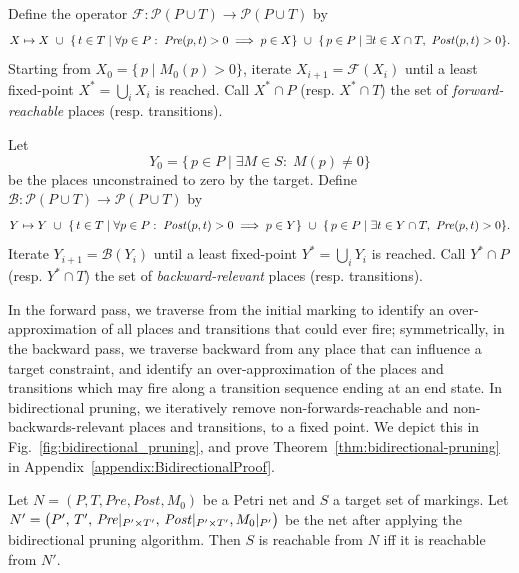 \begin{definition}
	Define the operator $\mathcal{F}:\mathcal{P}(P\cup T)\to\mathcal{P}(P\cup T)$ by
	\[
	X \mapsto X
	~\cup~
	\{\,t\in T \mid \forall p\in P:\; \mathit{Pre}(p,t)>0 \implies p\in X\}
	~\cup~
	\{\,p\in P \mid \exists t\in X\cap T,\ \mathit{Post}(p,t)>0\}.
	\]
	Starting from $X_0 = \{\,p\mid M_0(p)>0\}$, iterate
	$X_{i+1} = \mathcal{F}(X_i)$ until a least fixed-point
        $X^*=\bigcup_i X_i$ is reached.  Call $X^*\cap P$ (resp. $X^* \cap T$) the set of
        \emph{forward-reachable} places (resp. transitions).
\end{definition}

\begin{definition}
	Let
	\[
	Y_0 = \{\,p\in P \mid \exists M\in S:\;M(p)\neq0\}
	\]
	be the places unconstrained to zero by the target.  Define
	$\mathcal{B}:\mathcal{P}(P\cup T)\to\mathcal{P}(P\cup T)$ by
	\[
	Y \mapsto Y
	~\cup~
	\{\,t\in T \mid \forall p\in P:\; \mathit{Post}(p,t)>0 \implies p\in Y\}
	~\cup~
	\{\,p\in P \mid \exists t\in Y\cap T,\ \mathit{Pre}(p,t)>0\}.
	\]
	Iterate $Y_{i+1} = \mathcal{B}(Y_i)$ until a least fixed-point
        $Y^*=\bigcup_i Y_i$ is reached.  Call $Y^*\cap P$ (resp. $Y^* \cap T$) the set of
        \emph{backward-relevant} places (resp. transitions).
\end{definition}

In the forward pass, we traverse from the initial marking to identify an over-approximation of all places and transitions that could ever fire; symmetrically, in the backward pass, we traverse backward from any place that can influence a target constraint, and identify an over-approximation of the places and transitions which may fire along a transition sequence ending at an end state.
In bidirectional pruning, we iteratively remove non-forwards-reachable and
non-backwards-relevant places and transitions, to a fixed point.
We depict this in Fig.~\ref{fig:bidirectional_pruning}, and prove Theorem~\ref{thm:bidirectional-pruning} in Appendix~\ref{appendix:BidirectionalProof}.

\begin{theorem}
\label{thm:bidirectional-pruning}
  Let $N = (P, T, Pre, Post, M_0)$ be a Petri net and $S$ a target set of markings.
  Let $N' = \bigl(P',\,T',\,\mathit{Pre}|_{P'\times T'},\,\mathit{Post}|_{P'\times T'}, M_0|_{P'}\bigr)$ be the net after applying the bidirectional pruning algorithm.
%
  Then $S$ is reachable from $N$ iff it is reachable from $N'$.
\end{theorem}
%
%

